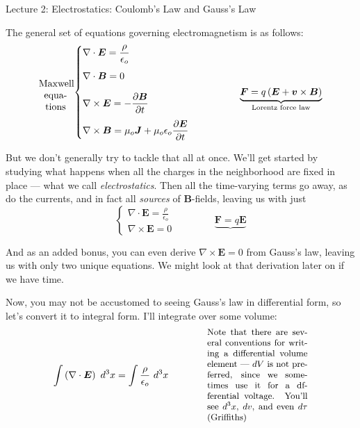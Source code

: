 \documentclass{article}
\begin{document}
\begin{center}
    {\Huge Lecture 2: Electrostatics: Coulomb's Law and Gauss's Law} \\[0.5cm]
\end{center}

\vspace{1em}

The general set of equations governing electromagnetism is as follows:
\begin{equation*}
    \parbox[c]{0.1\textwidth}{\begin{center}Maxwell equations\end{center}}\begin{cases} \displaystyle \nabla \cdot \bm{E} = \frac{\rho}{\epsilon_o} \\[1.0em] \displaystyle \nabla \cdot \bm{B} = 0 \\[1.0em] \displaystyle \nabla \times \bm{E} = -\frac{\partial \bm{B}}{\partial t} \\[1.0em] \displaystyle \nabla \times \bm{B} = \mu_o \bm{J} + \mu_o \epsilon_o \frac{\partial \bm{E}}{\partial t} \end{cases} \qquad\qquad \underbrace{\bm{F} = q \left( \bm{E} + \bm{v} \times \bm{B} \right)}_{\text{Lorentz force law}}
\end{equation*}

But we don't generally try to tackle that all at once. We'll get started by studying what happens when all the charges in the neighborhood are fixed in place --- what we call \emph{electrostatics}. Then all the time-varying terms go away, as do the currents, and in fact all \emph{sources} of $\bm{B}$-fields, leaving us with just
\begin{equation*}
    \begin{cases} \displaystyle \nabla \cdot \bm{E} = \frac{\rho}{\epsilon_o} \\[1.0em] \displaystyle \nabla \times \bm{E} = 0 \end{cases} \qquad\qquad \underbrace{\bm{F} = q \bm{E}}
\end{equation*}

And as an added bonus, you can even derive $\nabla \times \bm{E} = 0$ from Gauss's law, leaving us with only two unique equations. We might look at that derivation later on if we have time.

Now, you may not be accustomed to seeing Gauss's law in differential form, so let's convert it to integral form. I'll integrate over some volume:
\begin{equation*}
    \int \left( \nabla \cdot \bm{E} \right)\ d^3x = \int \frac{\rho}{\epsilon_o}\ d^3x \qquad\qquad \parbox[c]{0.3\textwidth}{\small Note that there are several conventions for writing a differential volume element --- $dV$ is not preferred, since we sometimes use it for a dfferential voltage. You'll see $d^3x$, $dv$, and even $d\tau$ (Griffiths)}
\end{equation*}
\end{document}
